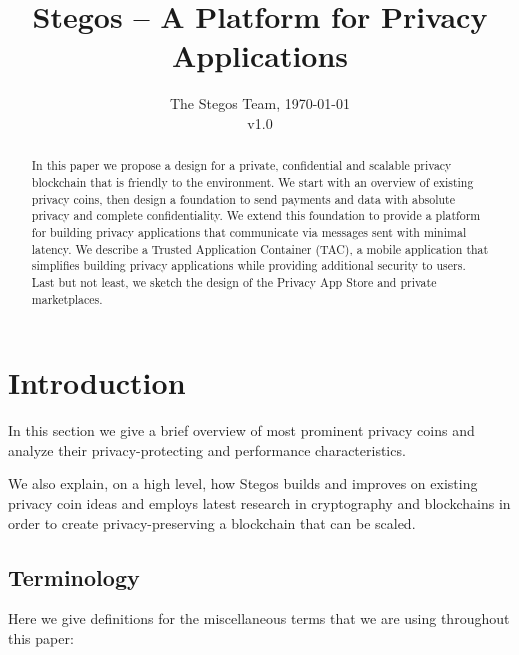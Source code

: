 \documentclass[a4paper, 10pt, conference]{ieeeconf}
\title{\LARGE \bf Stegos -- A Platform for Privacy Applications}
\author{The Stegos Team, \today \\v1.0}
\begin{document}
\maketitle
\thispagestyle{empty}
\pagestyle{plain}


\begin{abstract}
    In this paper we propose a design for a private, confidential and scalable privacy blockchain that is friendly to the environment. We start with an overview of existing privacy coins, then design a foundation to send payments and data with absolute privacy and complete confidentiality. We extend this foundation to provide a platform for building privacy applications that communicate via messages sent with minimal latency. We describe a Trusted Application Container (TAC), a mobile application that simplifies building privacy applications while providing additional security to users. Last but not least, we sketch the design of the Privacy App Store and private marketplaces. 
\end{abstract}

\section{Introduction}
In this section we give a brief overview of most prominent privacy coins and analyze their privacy-protecting and performance characteristics.

We also explain, on a high level, how Stegos builds and improves on existing privacy coin ideas and employs latest research in cryptography and blockchains in order to create privacy-preserving a blockchain that can be scaled. 

\subsection{Terminology}
Here we give definitions for the miscellaneous terms that we are using throughout this paper:
\end{document}
